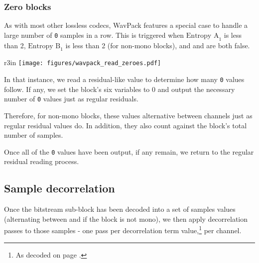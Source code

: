 \clearpage

\subsubsection{Zero blocks}

As with most other lossless codecs, WavPack features a special
case to handle a large number of \texttt{0} samples in a row.
This is triggered when $\text{Entropy A}_1$ is less than 2,
$\text{Entropy B}_1$ is less than 2 (for non-mono blocks),
and  and  are both false.

\begin{wrapfigure}[14]{r}{3in}
\texttt{[image: figures/wavpack\_read\_zeroes.pdf]}
\end{wrapfigure}

In that instance, we read a residual-like value to determine
how many \texttt{0} values follow.
If any, we set the block's six  variables to 0
and output the necessary number of \texttt{0} values just as
regular residuals.

Therefore, for non-mono blocks, these values alternative between channels
just as regular residual values do.
In addition, they also count against the block's total number of samples.

Once all of the \texttt{0} values have been output, if any
 remain, we return to the regular residual
reading process.

\clearpage

\subsection{Sample decorrelation}

Once the bitstream sub-block has been decoded into a set of
samples values (alternating between  and 
if the block is not mono), we then apply decorrelation passes
to those samples - one pass per decorrelation term value,\footnote{As
decoded on page \pageref{wavpack_decorr_terms}.} per channel.

